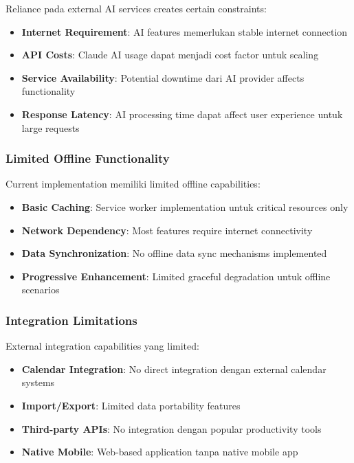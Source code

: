 Reliance pada external AI services creates certain constraints:

\begin{itemize}
\item \textbf{Internet Requirement}: AI features memerlukan stable internet connection
\item \textbf{API Costs}: Claude AI usage dapat menjadi cost factor untuk scaling
\item \textbf{Service Availability}: Potential downtime dari AI provider affects functionality
\item \textbf{Response Latency}: AI processing time dapat affect user experience untuk large requests
\end{itemize}

\subsubsection{Limited Offline Functionality}

Current implementation memiliki limited offline capabilities:

\begin{itemize}
\item \textbf{Basic Caching}: Service worker implementation untuk critical resources only
\item \textbf{Network Dependency}: Most features require internet connectivity
\item \textbf{Data Synchronization}: No offline data sync mechanisms implemented
\item \textbf{Progressive Enhancement}: Limited graceful degradation untuk offline scenarios
\end{itemize}

\subsubsection{Integration Limitations}

External integration capabilities yang limited:

\begin{itemize}
\item \textbf{Calendar Integration}: No direct integration dengan external calendar systems
\item \textbf{Import/Export}: Limited data portability features
\item \textbf{Third-party APIs}: No integration dengan popular productivity tools
\item \textbf{Native Mobile}: Web-based application tanpa native mobile app
\end{itemize}

